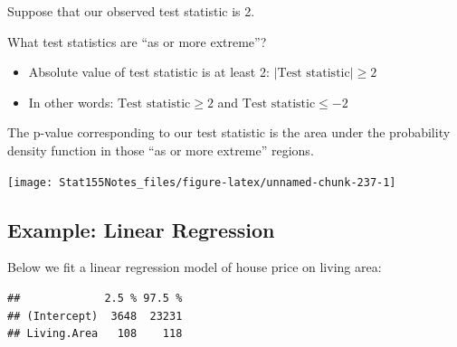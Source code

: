 \documentclass[]{book}
\newenvironment{Shaded}{\begin{snugshade}}{\end{snugshade}}
\newcommand{\CommentTok}[1]{\textcolor[rgb]{0.56,0.35,0.01}{\textit{#1}}}
\newcommand{\DataTypeTok}[1]{\textcolor[rgb]{0.13,0.29,0.53}{#1}}
\newcommand{\KeywordTok}[1]{\textcolor[rgb]{0.13,0.29,0.53}{\textbf{#1}}}
\newcommand{\NormalTok}[1]{#1}
\newcommand{\OperatorTok}[1]{\textcolor[rgb]{0.81,0.36,0.00}{\textbf{#1}}}
\newcommand{\StringTok}[1]{\textcolor[rgb]{0.31,0.60,0.02}{#1}}
\providecommand{\tightlist}{%
  \setlength{\itemsep}{0pt}\setlength{\parskip}{0pt}}
\begin{document}
Suppose that our observed test statistic is 2.

What test statistics are ``as or more extreme''?

\begin{itemize}
\tightlist
\item
  Absolute value of test statistic is at least 2: \(|\text{Test statistic}| \geq 2\)
\item
  In other words: \(\text{Test statistic} \geq 2\) and \(\text{Test statistic} \leq -2\)
\end{itemize}

The p-value corresponding to our test statistic is the area under the probability density function in those ``as or more extreme'' regions.

\begin{center}\texttt{[image: Stat155Notes\_files/figure-latex/unnamed-chunk-237-1]} \end{center}

\hypertarget{example-linear-regression}{%
\subsection{Example: Linear Regression}\label{example-linear-regression}}

Below we fit a linear regression model of house price on living area:

\begin{Shaded}
\end{Shaded}

\begin{verbatim}
##             2.5 % 97.5 %
## (Intercept)  3648  23231
## Living.Area   108    118
\end{verbatim}

\begin{Shaded}
\end{Shaded}
\end{document}

